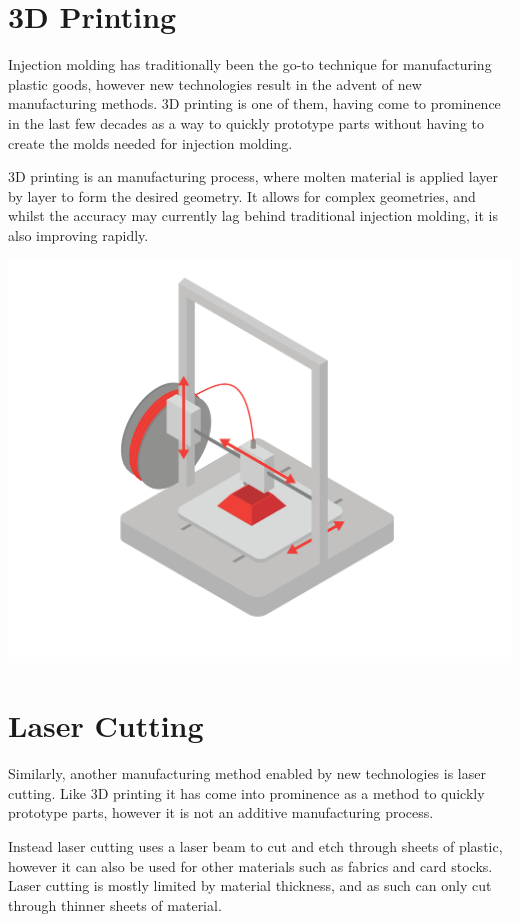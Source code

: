 
\section{3D Printing}

Injection molding has traditionally been the go-to technique for manufacturing plastic goods, however new technologies result in the advent of new manufacturing methods. 3D printing is one of them, having come to prominence in the last few decades as a way to quickly prototype parts without having to create the molds needed for injection molding.

3D printing is an  manufacturing process, where molten material is applied layer by layer to form the desired geometry. It allows for complex geometries, and whilst the accuracy may currently lag behind traditional injection molding, it is also improving rapidly.

\includegraphics[width=.75\textwidth]{3dprinter.png}


\section{Laser Cutting}

Similarly, another manufacturing method enabled by new technologies is laser cutting. Like 3D printing it has come into prominence as a method to quickly prototype parts, however it is not an additive manufacturing process.

Instead laser cutting uses a laser beam to cut and etch through sheets of plastic, however it can also be used for other materials such as fabrics and card stocks. Laser cutting is mostly limited by material thickness, and as such can only cut through thinner sheets of material.


